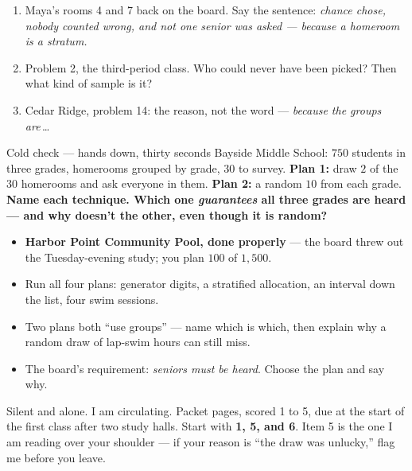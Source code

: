 \documentclass[aspectratio=169, 11pt]{beamer}
\begin{document}
\begin{frame}[t, plain]
  \vspace{4pt}
  \begin{enumerate}\setlength{\itemsep}{5pt}
    \item Maya's rooms 4 and 7 back on the board. Say the sentence: \emph{chance chose, nobody
          counted wrong, and not one senior was asked --- because a homeroom is a stratum.}
    \item Problem 2, the third-period class. Who could never have been picked? Then what kind
          of sample is it?
    \item Cedar Ridge, problem 14: the reason, not the word --- \emph{because the groups
          are}\,\ldots
  \end{enumerate}
  \vspace{6pt}
  \begin{block}{Cold check --- hands down, thirty seconds}
    Bayside Middle School: $750$ students in three grades, homerooms grouped by grade, $30$ to
    survey. \textbf{Plan 1:} draw $2$ of the $30$ homerooms and ask everyone in them.
    \textbf{Plan 2:} a random $10$ from each grade. \textbf{Name each technique. Which one
    \emph{guarantees} all three grades are heard --- and why doesn't the other, even though it
    is random?}
  \end{block}
\end{frame}

\begin{frame}[t, plain]
  \begin{itemize}\setlength{\itemsep}{5pt}
    \item \textbf{Harbor Point Community Pool, done properly} --- the board threw out the
          Tuesday-evening study; you plan $100$ of $1{,}500$.
    \item Run all four plans: generator digits, a stratified allocation, an interval down the
          list, four swim sessions.
    \item Two plans both ``use groups'' --- name which is which, then explain why a random draw
          of lap-swim hours can still miss.
    \item The board's requirement: \emph{seniors must be heard}. Choose the plan and say why.
  \end{itemize}
  \begin{block}{Silent and alone. I am circulating. Packet pages, scored 1 to 5, due at the start of the first class after two study halls.}
    Start with \textbf{1, 5, and 6}. Item 5 is the one I am reading over your shoulder ---
    if your reason is ``the draw was unlucky,'' flag me before you leave.
  \end{block}
\end{frame}
\end{document}
